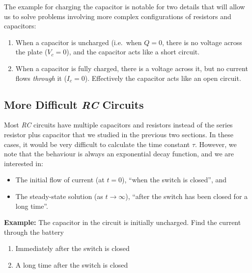 The example for charging the capacitor is notable for two details that will
allow us to solve problems involving more complex configurations of resistors
and capacitors:
\begin{enumerate}[itemsep=6pt]
\item When a capacitor is uncharged (i.e.\ when $Q=0$, there is no voltage
  across the plate ($V_c=0$), and the capacitor acts like a short circuit.
\item When a capacitor is fully charged, there is a voltage across it, but no
  current flows \emph{through} it ($I_c=0$). Effectively the capacitor acts
  like an open circuit.
\end{enumerate}



\subsection{More Difficult \emph{RC} Circuits}
Most \emph{RC} circuits have multiple capacitors and resistors instead of the
series resistor plus capacitor that we studied in the previous two sections. In
these cases, it would be very difficult to calculate the time constant $\tau$.
However, we note that the behaviour is always an exponential decay function,
and we are interested in:
\begin{itemize}
\item The initial flow of current (at $t=0$), ``when the switch is closed'',
  and
\item The steady-state solution (as $t\rightarrow\infty$), ``after the switch
  has been closed for a long time''.
\end{itemize}

\begin{center}
\end{center}
\textbf{Example:} The capacitor in the circuit is initially uncharged. Find
the current through the battery
\begin{enumerate}
\item Immediately after the switch is closed
\item A long time after the switch is closed
\end{enumerate}




